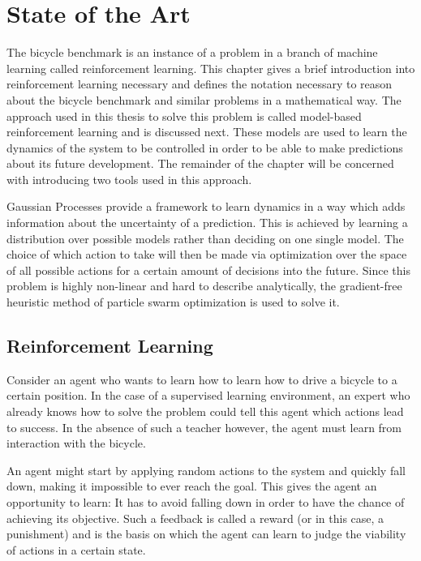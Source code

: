\chapter{State of the Art}
\label{cha:state_of_the_art}
The bicycle benchmark is an instance of a problem in a branch of machine learning called reinforcement learning.
This chapter gives a brief introduction into reinforcement learning necessary and defines the notation necessary to reason about the bicycle benchmark and similar problems in a mathematical way.
The approach used in this thesis to solve this problem is called model-based reinforcement learning and is discussed next.
These models are used to learn the dynamics of the system to be controlled in order to be able to make predictions about its future development.
The remainder of the chapter will be concerned with introducing two tools used in this approach.

Gaussian Processes provide a framework to learn dynamics in a way which adds information about the uncertainty of a prediction.
This is achieved by learning a distribution over possible models rather than deciding on one single model.
The choice of which action to take will then be made via optimization over the space of all possible actions for a certain amount of decisions into the future.
Since this problem is highly non-linear and hard to describe analytically, the gradient-free heuristic method of particle swarm optimization is used to solve it.

\section{Reinforcement Learning}
\label{sec:reinforcement_learning}
Consider an agent who wants to learn how to learn how to drive a bicycle to a certain position.
In the case of a supervised learning environment, an expert who already knows how to solve the problem could tell this agent which actions lead to success.
In the absence of such a teacher however, the agent must learn from interaction with the bicycle.

An agent might start by applying random actions to the system and quickly fall down, making it impossible to ever reach the goal.
This gives the agent an opportunity to learn:
It has to avoid falling down in order to have the chance of achieving its objective.
Such a feedback is called a reward (or in this case, a punishment) and is the basis on which the agent can learn to judge the viability of actions in a certain state.

